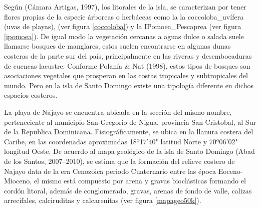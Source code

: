 \documentclass[11pt,]{article}
\begin{document}
Según (Cámara Artigas, 1997), los litorales de la isla, se caracterizan
por tener flores propias de la especie árboreas o herbáceas como la la
coccoloba\_uvífera (uvas de playas), (ver figura \ref{coccoloba}) y la
IPomoea\_Pescaprea (ver figura \ref{ipomoea}). De igual modo la
vegetación cercanas a aguas dulce o salada suele llamarse bosques de
manglares, estos suelen encontrarse en algunas dunas costeras de la
parte sur del país, principalmente en las riveras y desembocaduras de
cuencas lacustre. Conforme Polanía \& Nat (1998), estos tipos de bosques
son asociaciones vegetales que prosperan en las costas tropicales y
subtropicales del mundo. Pero en la isla de Santo Domingo existe una
tipología diferente en dichos espacios costeros.

La playa de Najayo se encuentra ubicada en la sección del mismo nombre,
perteneciente al municipio San Gregorio de Nigua, provincia San
Cristobal, al Sur de la Republica Dominicana. Fisiográficamente, se
ubica en la llanura costera del Caribe, en las coordenadas aproximadas
18º17'40" latitud Norte y 70º06'02" longitud Oeste. De acuerdo al mapa
geológico de la isla de Santo Domingo (Abad de los Santos, 2007--2010),
se estima que la formación del relieve costero de Najayo data de la era
Cenozoica periodo Cuaternario entre las época Eoceno-Mioceno, el mismo
está compuesto por arena y gravas bioclásticas formando el cordón
litoral, además de conglomerado, gravas, arenas de fondo de valle,
calizas arrecifales, calciruditas y calcarenitas (ver figura
\ref{mapageo50k}).
\end{document}
